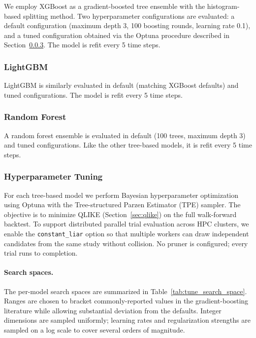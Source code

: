 We employ XGBoost \citep{Chen2016} as a gradient-boosted tree ensemble with the histogram-based splitting method. Two hyperparameter configurations are evaluated: a default configuration (maximum depth 3, 100 boosting rounds, learning rate 0.1), and a tuned configuration obtained via the Optuna procedure described in Section~\ref{sec:tuning}. The model is refit every 5 time steps.

\subsubsection{LightGBM}
\label{sec:lightgbm}

LightGBM \citep{Ke2017} is similarly evaluated in default (matching XGBoost defaults) and tuned configurations. The model is refit every 5 time steps.

\subsubsection{Random Forest}
\label{sec:rf}

A random forest ensemble is evaluated in default (100 trees, maximum depth 3) and tuned configurations. Like the other tree-based models, it is refit every 5 time steps.

\subsubsection{Hyperparameter Tuning}
\label{sec:tuning}

For each tree-based model we perform Bayesian hyperparameter optimization using Optuna \citep{Akiba2019} with the Tree-structured Parzen Estimator (TPE) sampler. The objective is to minimize QLIKE (Section~\ref{sec:qlike}) on the full walk-forward backtest. To support distributed parallel trial evaluation across HPC clusters, we enable the \texttt{constant\_liar} option so that multiple workers can draw independent candidates from the same study without collision. No pruner is configured; every trial runs to completion.

\paragraph{Search spaces.}
The per-model search spaces are summarized in Table~\ref{tab:tune_search_space}. Ranges are chosen to bracket commonly-reported values in the gradient-boosting literature while allowing substantial deviation from the defaults. Integer dimensions are sampled uniformly; learning rates and regularization strengths are sampled on a log scale to cover several orders of magnitude.

